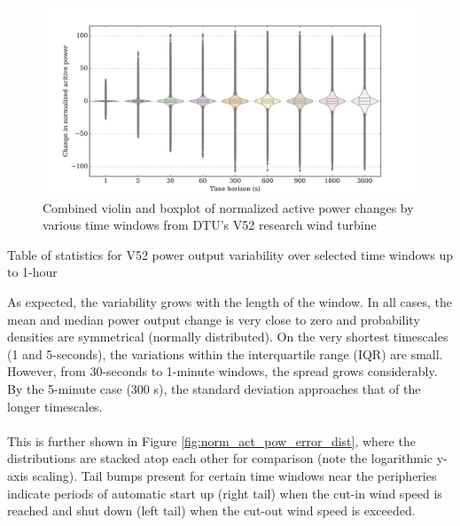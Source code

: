 \begin{figure}[htbp]
    \centering
        \includegraphics[width=1.0\textwidth]{graphics/intro/variability/act_pow_change_vioboxplot.png}
    \caption{Combined violin and boxplot of normalized active power changes by various time windows from DTU's V52 research wind turbine}
    \label{fig:act_pow_change_vioboxplot}
\end{figure}

\begin{table}
    \centering
    \caption{Table of statistics for V52 power output variability over selected time windows up to 1-hour}
    
    \label{tab:intro_v52_variability_statistics}
\end{table}

As expected, the variability grows with the length of the window. In all cases, the mean and median power output change is very close to zero and probability densities are symmetrical (normally distributed). On the very shortest timescales (1 and 5-seconds), the variations within the interquartile range (IQR) are small. However, from 30-seconds to 1-minute windows, the spread grows considerably. By the 5-minute case (300 s), the standard deviation approaches that of the longer timescales.
\\\\
This is further shown in Figure \ref{fig:norm_act_pow_error_dist}, where the distributions are stacked atop each other for comparison (note the logarithmic y-axis scaling). Tail bumps present for certain time windows near the peripheries indicate periods of automatic start up (right tail) when the cut-in wind speed is reached and shut down (left tail) when the cut-out wind speed is exceeded.


